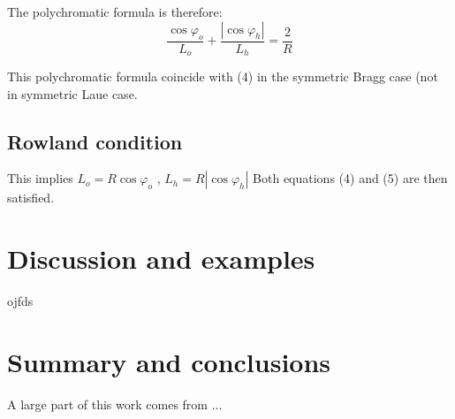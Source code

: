 \documentclass{iucr}              %
\begin{document}
The polychromatic formula is therefore:
\begin{equation}
\frac{{\cos {\varphi _o}}}{{{L_o}}} + \frac{{\left| {\cos {\varphi _h}} \right|}}{{{L_h}}} = \frac{2}{R}
\end{equation}

This polychromatic formula coincide with (4) in the symmetric Bragg case (not in symmetric Laue case.

\subsection{Rowland condition}

This implies  ${L_o} = R\cos {\varphi _o}$ ,  ${L_h} = R\left| {\cos {\varphi _h}} \right|$
Both equations (4) and (5) are then satisfied.


\section{Discussion and examples}

ojfds

\section{Summary and conclusions}

%
%
A large part of this work comes from ...










\end{document}
